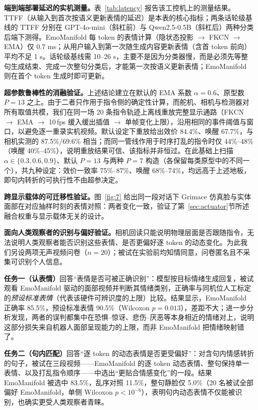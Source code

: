 \documentclass[letterpaper, 10 pt, conference]{ieeeconf/ieeeconf}
\begin{document}
\textbf{端到端部署延迟的实机测量。}表~\ref{tab:latency} 报告该工控机上的测量结果。TTFF（从输入到首次按语义更新表情的延迟）是本表的核心指标；两条话轮级基线的 TTFF 分别在 GPT-4o-mini（斜杠前）与 Qwen2.5-0.5B（斜杠后）两种分类后端下测得。EmoManifold 每 token 的表情计算（隐状态投影 $\to$ FKCN $\to$ EMA）仅 $0.7$ ms；从用户输入到第一次随生成内容更新表情（含首 token 前向）平均不足 1 s。话轮级基线需 10--26 s，主要不是因为分类器慢，而是必须先等整句生成结束、完成一次整句分类后，才能第一次按语义更新表情；EmoManifold 则在首个 token 生成时即可更新。

\textbf{超参数鲁棒性的消融验证。}上述结论建立在默认的 EMA 系数 $\alpha{=}0.6$、原型数 $P{=}13$ 之上。由于二者只作用于指令侧的确定性计算，而舵机、相机与检测器对所有取值共模，我们在同一场 20 条指令轨迹上离线重放完整显示通路（FKCN $\to$ EMA $\to$ 10\,fps 缓入缓出插值 $\to$ 单帧变化上限），沿用相同的事件阈值与窗口，以避免逐一重录实机视频。默认设定下重放给出效价 84.4\%、唤醒 67.7\%，与相机实测的 87.5\%/69.6\% 相当；而同一管线作用于时序打乱的指令时仅 44\%--48\%（唤醒 40\%--45\%），说明重放结果可信、该指标并非恒过。在此基础上扫描 $\alpha\in\{0.3,0.6,0.9\}$、默认 $P{=}13$ 与两种 $P{=}7$ 构造（各保留每类原型中的不同一个），共九种设定：效价一致率 75\%--87\%、唤醒 68\%--74\%，均远高于上述地板，即句内转折的可执行性不由超参决定。

\textbf{跨显示载体的可迁移性验证。}图~\ref{fig:7} 给出同一段对话下 Grimace 仿真脸与实体面部在对应抽样时刻的表情对照：两者变化一致，验证了第~\ref{sec:actuator}节所述融合权重与显示载体无关的设计。

\textbf{面向人类观察者的识别与偏好验证。}相机回读只能说明物理层面是否跟随指令，无法说明人类观察者能否识别这些表情、是否更偏好逐 token 的动态变化。为此我们另设两项无声视频问卷（$n{=}20$）；被试在实验前均知情同意，问卷匿名且不采集可识别个人信息。

\textbf{任务一（认表情）}回答``表情是否可被正确识别''：模型按目标情绪生成回复，被试观看 EmoManifold 驱动的面部视频并判断其情绪类别，正确率与同机位人工标定的\emph{预设标准表情}（代表该硬件可辨识度的上限）比较。结果显示，EmoManifold 正确率 85.5\%，预设标准表情 90.5\%（Wilcoxon $p{=}0.013$），差距不大；进一步分析发现，两者的误判都集中在恐惧--惊讶、悲伤--厌恶等本身相近的情绪对上，说明这部分损失来自机器人面部呈现能力的上限，而非 EmoManifold 把情绪映射错了。

\textbf{任务二（句内匹配）}回答``逐 token 的动态表情是否更受偏好''：对含句内情感转折的句子，被试在三段视频——EmoManifold 的逐 token 动态表情、整句保持单一表情、以及打乱指令顺序——中选出``更贴合情感变化''的一段。结果 EmoManifold 被选中 83.5\%，乱序对照 11.5\%，整句静脸仅 5.0\%（20 名被试全部偏好 EmoManifold，单侧 Wilcoxon $p{<}10^{-6}$），表明句内动态表情不仅能被识别，也确实更受人类观察者青睐。
\end{document}

